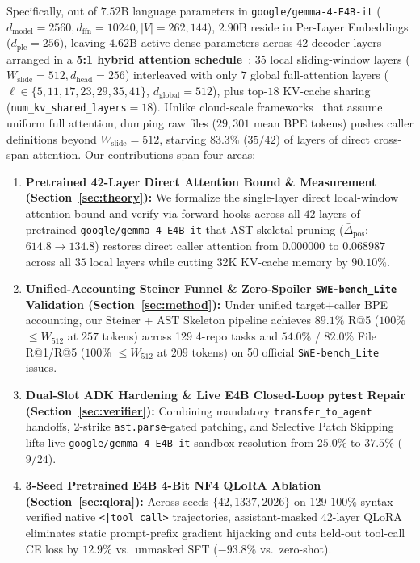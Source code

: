 \documentclass[10pt,twocolumn,letterpaper]{article}
\begin{document}
Specifically, out of $7.52\text{B}$ language parameters in \texttt{google/gemma-4-E4B-it} ($d_{\text{model}}{=}2560, d_{\text{ffn}}{=}10240, |V|{=}262{,}144$), $2.90\text{B}$ reside in Per-Layer Embeddings ($d_{\text{ple}}{=}256$), leaving $4.62\text{B}$ active dense parameters across $42$ decoder layers arranged in a \textbf{5:1 hybrid attention schedule}~\cite{gemma4report}: $35$ local sliding-window layers ($W_{\text{slide}}{=}512, d_{\text{head}}{=}256$) interleaved with only $7$ global full-attention layers ($\ell \in \{5,11,17,23,29,35,41\}$, $d_{\text{global}}{=}512$), plus top-$18$ KV-cache sharing (\texttt{num\_kv\_shared\_layers}${=}18$). Unlike cloud-scale frameworks~\cite{xia2024agentless,ouyang2025repograph,chen2025locagent,yu2025orcaloca} that assume uniform full attention, dumping raw files ($29,301$ mean BPE tokens) pushes caller definitions beyond $W_{\text{slide}}{=}512$, starving $83.3\%$ ($35/42$) of layers of direct cross-span attention. Our contributions span four areas:
\begin{enumerate}
    \item \textbf{Pretrained 42-Layer Direct Attention Bound \& Measurement (Section~\ref{sec:theory}):} We formalize the single-layer direct local-window attention bound and verify via forward hooks across all $42$ layers of pretrained \texttt{google/gemma-4-E4B-it} that AST skeletal pruning ($\bar{\Delta}_{\text{pos}}$: $614.8 \to 134.8$) restores direct caller attention from $0.000000$ to $0.068987$ across all $35$ local layers while cutting 32K KV-cache memory by $90.10\%$.
    \item \textbf{Unified-Accounting Steiner Funnel \& Zero-Spoiler \texttt{SWE-bench\_Lite} Validation (Section~\ref{sec:method}):} Under unified target+caller BPE accounting, our Steiner + AST Skeleton pipeline achieves $89.1\%$ R@5 ($100\%$ $\le W_{512}$ at $257$ tokens) across 129 4-repo tasks and $54.0\%$ / $82.0\%$ File R@1/R@5 ($100\%$ $\le W_{512}$ at $209$ tokens) on 50 official \texttt{SWE-bench\_Lite} issues.
    \item \textbf{Dual-Slot ADK Hardening \& Live E4B Closed-Loop \texttt{pytest} Repair (Section~\ref{sec:verifier}):} Combining mandatory \texttt{transfer\_to\_agent} handoffs, 2-strike \texttt{ast.parse}-gated patching, and Selective Patch Skipping lifts live \texttt{google/gemma-4-E4B-it} sandbox resolution from $25.0\%$ to \textbf{$37.5\%$} ($9/24$).
    \item \textbf{3-Seed Pretrained E4B 4-Bit NF4 QLoRA Ablation (Section~\ref{sec:qlora}):} Across seeds $\{42,1337,2026\}$ on 129 $100\%$ syntax-verified native \texttt{<|tool\_call>} trajectories, assistant-masked 42-layer QLoRA eliminates static prompt-prefix gradient hijacking and cuts held-out tool-call CE loss by $12.9\%$ vs.\ unmasked SFT ($-93.8\%$ vs.\ zero-shot).
\end{enumerate}
\end{document}
